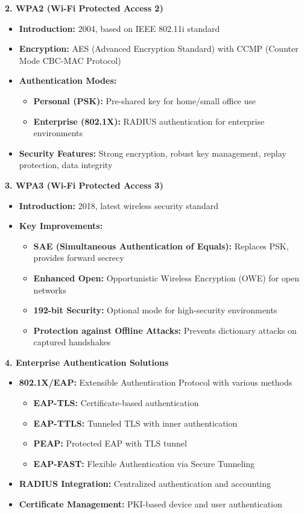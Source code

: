 \documentclass[12pt,a4paper]{article}
\begin{document}
\textbf{2. WPA2 (Wi-Fi Protected Access 2)}
\begin{itemize}
    \item \textbf{Introduction:} 2004, based on IEEE 802.11i standard
    \item \textbf{Encryption:} AES (Advanced Encryption Standard) with CCMP (Counter Mode CBC-MAC Protocol)
    \item \textbf{Authentication Modes:}
    \begin{itemize}
        \item \textbf{Personal (PSK):} Pre-shared key for home/small office use
        \item \textbf{Enterprise (802.1X):} RADIUS authentication for enterprise environments
    \end{itemize}
    \item \textbf{Security Features:} Strong encryption, robust key management, replay protection, data integrity
\end{itemize}

\textbf{3. WPA3 (Wi-Fi Protected Access 3)}
\begin{itemize}
    \item \textbf{Introduction:} 2018, latest wireless security standard
    \item \textbf{Key Improvements:}
    \begin{itemize}
        \item \textbf{SAE (Simultaneous Authentication of Equals):} Replaces PSK, provides forward secrecy
        \item \textbf{Enhanced Open:} Opportunistic Wireless Encryption (OWE) for open networks
        \item \textbf{192-bit Security:} Optional mode for high-security environments
        \item \textbf{Protection against Offline Attacks:} Prevents dictionary attacks on captured handshakes
    \end{itemize}
\end{itemize}

\textbf{4. Enterprise Authentication Solutions}
\begin{itemize}
    \item \textbf{802.1X/EAP:} Extensible Authentication Protocol with various methods
    \begin{itemize}
        \item \textbf{EAP-TLS:} Certificate-based authentication
        \item \textbf{EAP-TTLS:} Tunneled TLS with inner authentication
        \item \textbf{PEAP:} Protected EAP with TLS tunnel
        \item \textbf{EAP-FAST:} Flexible Authentication via Secure Tunneling
    \end{itemize}
    \item \textbf{RADIUS Integration:} Centralized authentication and accounting
    \item \textbf{Certificate Management:} PKI-based device and user authentication
\end{itemize}
\end{document}
